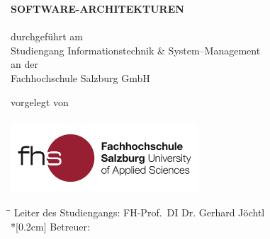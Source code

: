
\begin{titlepage}

\hspace{7cm}

\begin{center}
	{\Large\uppercase\expandafter{\bf Software-Architekturen}}\\[0.5ex]
	\vspace{1cm}
	\Large{\bf\large \Title}\\
	\vspace{1.5cm}
	\normalsize durchgeführt am\\
	Studiengang Informationstechnik \& System--Management\\
	an der\\
	Fachhochschule Salzburg GmbH\\
\end{center}

\vspace{2cm}

\begin{center}
	\normalsize vorgelegt von
	\\
	{
		\Large{\bf\large \Author}\\
	}
	\vspace{2cm}
	\includegraphics[width=7cm]{BilderAllgemein/Logo.jpg}\medskip
\end{center}
	
\vspace{2cm}

\begin{tabbing}
	\hspace*{3cm}\=\hspace*{5.5 cm}\= \kill
	\> Leiter des Studiengangs: \> FH-Prof.~DI Dr. Gerhard Jöchtl \\*[0.2cm]
	\> Betreuer: \> \Advisor \\
\end{tabbing}

\vfill	

\begin{center}
\VenueMonthYear\\
\end{center}
\end{titlepage}